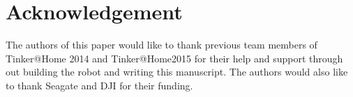 \documentclass[runningheads,a4paper]{llncs}
\begin{document}


\section*{Acknowledgement}
The authors of this paper would like to thank previous team members of Tinker@Home 2014 and Tinker@Home2015 for their help and support through out building the robot and writing this manuscript. The authors would also like to thank Seagate and DJI for their funding. 




\end{document}
